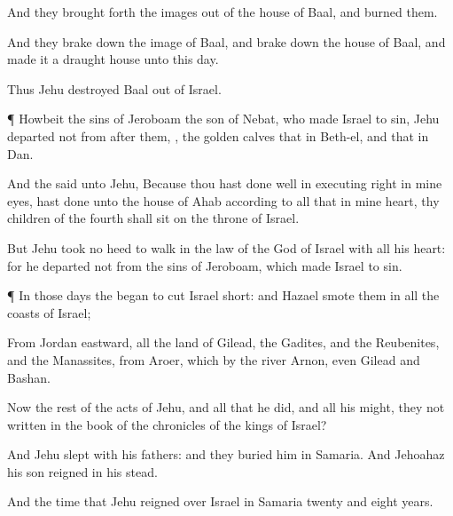 {And they brought
forth the
images out of the
house of
Baal, and
burned them.

And they brake
down the
image of
Baal, and brake
down the
house of
Baal, and
made it a draught
house unto this
day.

Thus
Jehu
destroyed
Baal out of
Israel.


\par }{\PP {}¶ Howbeit
{} the
sins of
Jeroboam the
son of
Nebat, who made
Israel to
sin,
Jehu
departed not from
after them,
{}, the
golden
calves that
{} in
Beth-el, and that
{} in
Dan.

And the
{}
said unto
Jehu, Because thou hast done
well in
executing
{}
right in mine
eyes,
{} hast
done unto the
house of
Ahab according to all that
{} in mine
heart, thy
children of the
fourth
{} shall
sit on the
throne of
Israel.

But
Jehu took no
heed to
walk in the
law of the
{}
God of
Israel with all his
heart: for he
departed not from the
sins of
Jeroboam, which made
Israel to
sin.


\par }{\PP {}¶ In those
days the
{}
began to
cut
Israel
short: and
Hazael
smote them in all the
coasts of
Israel;

From
Jordan
eastward, all the
land of
Gilead, the
Gadites, and the
Reubenites, and the
Manassites, from
Aroer, which
{} by the
river
Arnon, even
Gilead and
Bashan.

Now the
rest of the
acts of
Jehu, and all that he
did, and all his
might,
{} they not
written in the
book of the
chronicles of the
kings of
Israel?

And
Jehu
slept with his
fathers: and they
buried him in
Samaria. And
Jehoahaz his
son
reigned in his stead.

And the
time that
Jehu
reigned over
Israel in
Samaria
{}
twenty and
eight
years.




\par }
